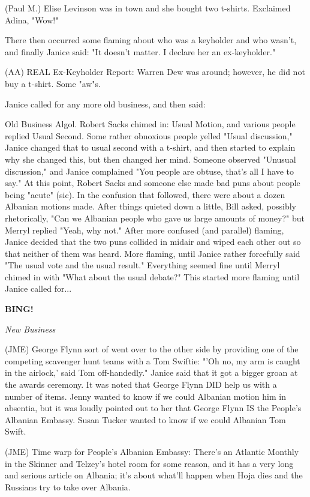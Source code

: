 \documentclass[12pt]{article}
\newcommand{\bing}{{\bf BING!} }
\newcommand{\goto}[1]{\bing \vskip 12pt \centerline{{\em{#1}}}}
\begin{document}
(Paul M.) Elise Levinson was in town and she bought two t-shirts. Exclaimed Adina, "Wow!"

There then occurred some flaming about who was a keyholder and who wasn't, and finally Janice said: "It doesn't matter. I declare her an ex-keyholder."

(AA) REAL Ex-Keyholder Report: Warren Dew was around; however, he did not buy a t-shirt. Some "aw"s.

Janice called for any more old business, and then said:

Old Business Algol. Robert Sacks chimed in: Usual Motion, and various people replied Usual Second. Some rather obnoxious people yelled "Usual discussion," Janice changed that to usual second with a t-shirt, and then started to explain why she changed this, but then changed her mind. Someone observed "Unusual discussion," and Janice complained "You people are obtuse, that's all I have to say." At this point, Robert Sacks and someone else made bad puns about people being "acute" (sic). In the confusion that followed, there were about a dozen Albanian motions made. After things quieted down a little, Bill asked, possibly rhetorically, "Can we Albanian people who gave us large amounts of money?" but Merryl replied "Yeah, why not." After more confused (and parallel) flaming, Janice decided that the two puns collided in midair and wiped each other out so that neither of them was heard. More flaming, until Janice rather forcefully said "The usual vote and the usual result." Everything seemed fine until Merryl chimed in with "What about the usual debate?" This started more flaming until Janice called for...

\goto{New Business}

(JME) George Flynn sort of went over to the other side by providing one of the competing scavenger hunt teams with a Tom Swiftie: "'Oh no, my arm is caught in the airlock,' said Tom off-handedly." Janice said that it got a bigger groan at the awards ceremony. It was noted that George Flynn DID help us with a number of items. Jenny wanted to know if we could Albanian motion him in absentia, but it was loudly pointed out to her that George Flynn IS the People's Albanian Embassy. Susan Tucker wanted to know if we could Albanian Tom Swift.

(JME) Time warp for People's Albanian Embassy: There's an Atlantic Monthly in the Skinner and Telzey's hotel room for some reason, and it has a very long and serious article on Albania; it's about what'll happen when Hoja dies and the Russians try to take over Albania.
\end{document}

